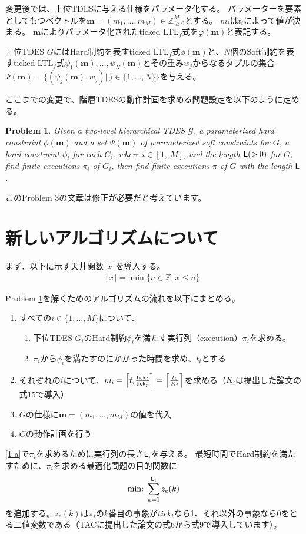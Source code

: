 \documentclass[ 10pt]{jsarticle}
\newtheorem{pbm}{Problem}
\newcommand{\tick}{{\sf tick}}
\newcommand{\Len}{{\sf L}}
\begin{document}
変更後では、上位TDESに与える仕様をパラメータ化する。
パラメーターを要素としてもつベクトルを$\bm{m}=(m_1,\ldots,m_M)\in\mathbb{Z}_{\geq 0}^M$とする。
$m_i$は$t_i$によって値が決まる。
$\bm{m}$によりパラメータ化されたticked LTL${}_f$式を$\varphi(\bm{m})$と表記する。

上位TDES $G$にはHard制約を表すticked LTL${}_f$式$\phi(\bm{m})$と、$N$個のSoft制約を表すticked LTL${}_f$式$\psi_1(\bm{m}),\ldots,\psi_N(\bm{m})$とその重み$w_j$からなるタプルの集合$\Psi(\bm{m})=\{(\psi_j(\bm{m}),w_j)|\ j\in\{1,\ldots,N\}\}$を与える。

ここまでの変更で、階層TDESの動作計画を求める問題設定を以下のように定める。
\begin{pbm}\label{pbm3}
Given a two-level hierarchical TDES $\mathcal{G}$, a parameterized hard constraint $\phi(\bm{m})$ and a set $\Psi(\bm{m})$ of parameterized soft constraints for $G$, a  hard constraint $\phi_i$ for each $G_i$, where $i \in [1,\ M]$, and the length $\Len(>0)$ for $G$, find finite executions $\pi_i$ of $G_i$, then find finite executions $\pi$ of $G$ with the length $\Len$.
%
\end{pbm}
%
このProblem 3の文章は修正が必要だと考えています。
%
%
\section{新しいアルゴリズムについて}\label{app}
%
まず、以下に示す天井関数$\lceil x \rceil$を導入する。
\begin{align}
\lceil x \rceil =\min\{n\in\mathbb{Z}|\ x\leq n\}.
\end{align}
%

Problem \ref{pbm3}を解くためのアルゴリズムの流れを以下にまとめる。
%
\begin{enumerate}
\item
すべての$i\in\{1,\ldots,M\}$について、
\begin{enumerate}
\item\label{1-a}
下位TDES $G_i$のHard制約$\phi_i$を満たす実行列（execution）$\pi_i$を求める。
\item\label{1-b}
$\pi_i$から$\phi_i$を満たすのにかかった時間を求め、$t_i$とする
\end{enumerate}
\item\label{2}
それぞれの$i$について、$m_i=\left\lceil t_i\frac{\tick_i}{\tick_p} \right\rceil = \left\lceil \frac{t_i}{K_i}\right\rceil $を求める（$K_i$は提出した論文の式15で導入）
\item
$G$の仕様に$\bm{m}=(m_1,\ldots,m_M)$の値を代入
\item
$G$の動作計画を行う
\end{enumerate}
%
\ref{1-a}で$\pi_i$を求めるために実行列の長さ$\Len_i$を与える。
最短時間でHard制約を満たすために、$\pi_i$を求める最適化問題の目的関数に
\begin{align}
\mbox{min:}~\sum_{k=1}^{\Len_i}z_e(k)
\end{align}
を追加する。$z_e(k)$は$\pi_i$の$k$番目の事象が$\textit{tick}_i$なら1、それ以外の事象なら0をとる二値変数である（TACに提出した論文の式6から式9で導入しています）。
\end{document}
